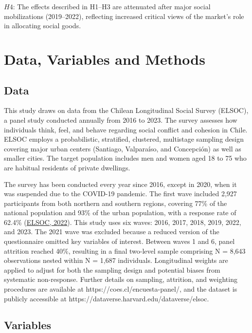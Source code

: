 \documentclass[
  12pt,
]{article}
\begin{document}
\(H4\): The effects described in H1--H3 are attenuated after major
social mobilizations (2019--2022), reflecting increased critical views
of the market's role in allocating social goods.

\hypertarget{data-variables-and-methods}{%
\section{Data, Variables and Methods}\label{data-variables-and-methods}}

\hypertarget{data}{%
\subsection{Data}\label{data}}

This study draws on data from the Chilean Longitudinal Social Survey
(ELSOC), a panel study conducted annually from 2016 to 2023. The survey
assesses how individuals think, feel, and behave regarding social
conflict and cohesion in Chile. ELSOC employs a probabilistic,
stratified, clustered, multistage sampling design covering major urban
centers (Santiago, Valparaíso, and Concepción) as well as smaller
cities. The target population includes men and women aged 18 to 75 who
are habitual residents of private dwellings.

The survey has been conducted every year since 2016, except in 2020,
when it was suspended due to the COVID-19 pandemic. The first wave
included 2,927 participants from both northern and southern regions,
covering 77\% of the national population and 93\% of the urban
population, with a response rate of 62.4\%
(\protect\hyperlink{ref-elsoc_estudio_2022}{ELSOC, 2022}). This study
uses six waves: 2016, 2017, 2018, 2019, 2022, and 2023. The 2021 wave
was excluded because a reduced version of the questionnaire omitted key
variables of interest. Between waves 1 and 6, panel attrition reached
40\%, resulting in a final two-level sample comprising N = 8,643
observations nested within N = 1,687 individuals. Longitudinal weights
are applied to adjust for both the sampling design and potential biases
from systematic non-response. Further details on sampling, attrition,
and weighting procedures are available at
https://coes.cl/encuesta-panel/, and the dataset is publicly accessible
at https://dataverse.harvard.edu/dataverse/elsoc.

\hypertarget{variables}{%
\subsection{Variables}\label{variables}}
\end{document}
